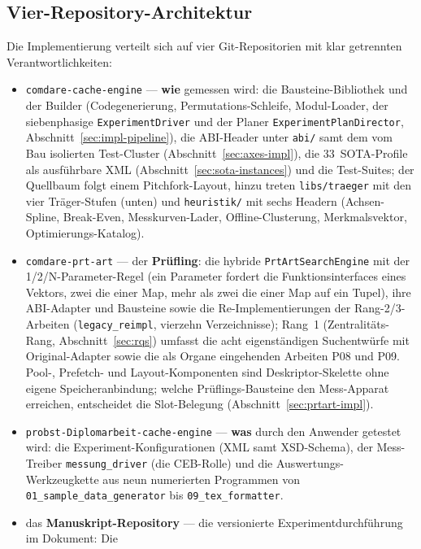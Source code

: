 \begin{nurkurz}
\section{Vier-Repository-Architektur}\label{sec:repos}
Die Implementierung verteilt sich auf vier Git-Repositorien mit klar getrennten Verantwortlichkeiten:
\begin{itemize}
  \item \texttt{comdare-cache-engine} --- \textbf{wie} gemessen wird: die Bausteine-Bibliothek und der
  Builder (Codegenerierung, Permutations-Schleife, Modul-Loader, der siebenphasige \texttt{ExperimentDriver}
  und der Planer \texttt{ExperimentPlanDirector}, Abschnitt~\ref{sec:impl-pipeline}), die ABI-Header unter
  \texttt{abi/} samt dem vom Bau isolierten Test-Cluster (Abschnitt~\ref{sec:axes-impl}), die
  33~SOTA-Profile als ausführbare XML (Abschnitt~\ref{sec:sota-instances}) und die Test-Suites; der
  Quellbaum folgt einem Pitchfork-Layout, hinzu treten \texttt{libs/traeger} mit den vier Träger-Stufen
  (unten) und \texttt{heuristik/} mit sechs Headern (Achsen-Spline, Break-Even, Messkurven-Lader,
  Offline-Clusterung, Merkmalsvektor, Optimierungs-Katalog).
  \item \texttt{comdare-prt-art} --- der \textbf{Prüfling}: die hybride \texttt{PrtArtSearchEngine} mit der
  1/2/N-Parameter-Regel (ein Parameter fordert die Funktionsinterfaces eines Vektors, zwei die einer Map,
  mehr als zwei die einer Map auf ein Tupel), ihre ABI-Adapter und Bausteine sowie die Re-Implementierungen
  der Rang-2/3-Arbeiten (\texttt{legacy\_\allowbreak{}reimpl}, vierzehn Verzeichnisse); Rang~1
  (Zentralitäts-Rang, Abschnitt~\ref{sec:rqs}) umfasst die acht eigenständigen Suchentwürfe mit
  Original-Adapter sowie die als Organe eingehenden Arbeiten P08 und P09. Pool-, Prefetch- und
  Layout-Komponenten sind Deskriptor-Skelette ohne eigene Speicheranbindung; welche Prüflings-Bausteine
  den Mess-Apparat erreichen, entscheidet die Slot-Belegung (Abschnitt~\ref{sec:prtart-impl}).
  \item \texttt{probst-Diplomarbeit-cache-engine} --- \textbf{was} durch den Anwender getestet wird: die
  Experiment-Konfigurationen (XML samt XSD-Schema), der Mess-Treiber \texttt{messung\_driver} (die
  CEB-Rolle) und die Auswertungs-Werkzeugkette aus neun numerierten Programmen von
  \texttt{01\_\allowbreak{}sample\_\allowbreak{}data\_\allowbreak{}generator} bis
  \texttt{09\_\allowbreak{}tex\_\allowbreak{}formatter}.
  \item das \textbf{Manuskript-Repository} --- die versionierte Experimentdurchführung im Dokument: Die

\end{itemize}
\end{nurkurz}

